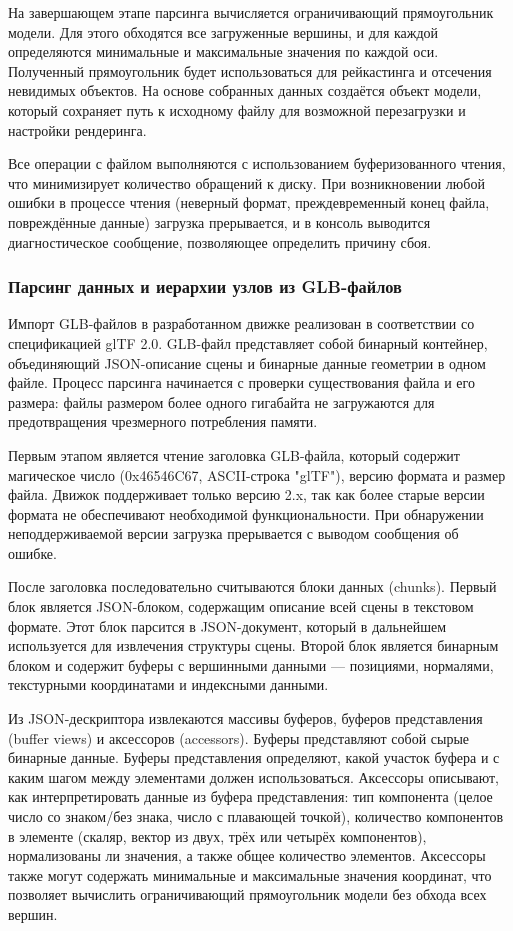 На завершающем этапе парсинга вычисляется ограничивающий прямоугольник модели. Для этого обходятся все загруженные вершины, и для каждой определяются минимальные и максимальные значения по каждой оси. Полученный прямоугольник будет использоваться для рейкастинга и отсечения невидимых объектов. На основе собранных данных создаётся объект модели, который сохраняет путь к исходному файлу для возможной перезагрузки и настройки рендеринга.

Все операции с файлом выполняются с использованием буферизованного чтения, что минимизирует количество обращений к диску. При возникновении любой ошибки в процессе чтения (неверный формат, преждевременный конец файла, повреждённые данные) загрузка прерывается, и в консоль выводится диагностическое сообщение, позволяющее определить причину сбоя.

\subsubsection{Парсинг данных и иерархии узлов из GLB-файлов}
Импорт GLB-файлов в разработанном движке реализован в соответствии со спецификацией glTF 2.0. GLB-файл представляет собой бинарный контейнер, объединяющий JSON-описание сцены и бинарные данные геометрии в одном файле. Процесс парсинга начинается с проверки существования файла и его размера: файлы размером более одного гигабайта не загружаются для предотвращения чрезмерного потребления памяти.

Первым этапом является чтение заголовка GLB-файла, который содержит магическое число (0x46546C67, ASCII-строка "glTF"), версию формата и размер файла. Движок поддерживает только версию 2.x, так как более старые версии формата не обеспечивают необходимой функциональности. При обнаружении неподдерживаемой версии загрузка прерывается с выводом сообщения об ошибке.

После заголовка последовательно считываются блоки данных (chunks). Первый блок является JSON-блоком, содержащим описание всей сцены в текстовом формате. Этот блок парсится в JSON-документ, который в дальнейшем используется для извлечения структуры сцены. Второй блок является бинарным блоком и содержит буферы с вершинными данными — позициями, нормалями, текстурными координатами и индексными данными.

Из JSON-дескриптора извлекаются массивы буферов, буферов представления (buffer views) и аксессоров (accessors). Буферы представляют собой сырые бинарные данные. Буферы представления определяют, какой участок буфера и с каким шагом между элементами должен использоваться. Аксессоры описывают, как интерпретировать данные из буфера представления: тип компонента (целое число со знаком/без знака, число с плавающей точкой), количество компонентов в элементе (скаляр, вектор из двух, трёх или четырёх компонентов), нормализованы ли значения, а также общее количество элементов. Аксессоры также могут содержать минимальные и максимальные значения координат, что позволяет вычислить ограничивающий прямоугольник модели без обхода всех вершин.

